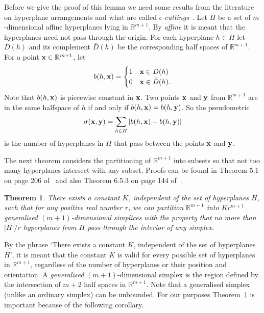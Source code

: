 \documentclass[aap]{imsart}
\newcommand{\reals}{{\mathbb R}}
\newcommand{\abs}[1]{\left\vert #1 \right\vert}
\newtheorem{theorem}{Theorem}
\begin{document}
Before we give the proof of this lemma we need some results from the literature on hyperplane arrangements and what are called \emph{$\epsilon$-cuttings}~\cite{Chazelle_discrepency_method_2000,Matousek_lect_disc_geom_2002}.  Let $H$ be a set of $m$-dimensional affine hyperplanes lying in $\reals^{m+1}$.  By \emph{affine} it is meant that  the hyperplanes need not pass through the origin.  For each hyperplane $h \in H$ let $D(h)$ and its complement $\bar{D}(h)$ be the corresponding half spaces of $\mathbb{R}^{m+1}$.  For a point $\mathbf{x} \in \mathbb{R}^{m+1}$, let
\begin{equation}\label{eq:bhsi}
b(h,\xbf) = \begin{cases} 
1 & \xbf \in D(h) \\
0 & \xbf \in \bar{D}(h).
\end{cases}
\end{equation}
Note that $b(h,\mathbf{x})$ is piecewise constant in $\mathbf{x}$.  Two points $\mathbf{x}$ and $\mathbf{y}$ from $\reals^{m+1}$ are in the same halfspace of $h$ if and only if $b(h, \mathbf{x}) = b(h, \mathbf{y})$.  So the pseudometric
\[
\sigma(\mathbf{x},\mathbf{y}) = \sum_{h \in H} |b(h,\mathbf{x}) - b(h,\mathbf{y})|
\]
is the number of hyperplanes in $H$ that pass between the points $\mathbf{x}$ and $\mathbf{y}$.  %

The next theorem considers the partitioning of $\reals^{m+1}$ into subsets so that not too many hyperplanes intersect with any subset.  Proofs can be found in Theorem 5.1 on page 206 of~\cite{Chazelle_discrepency_method_2000} and also Theorem 6.5.3 on page 144 of~\cite{Matousek_lect_disc_geom_2002}.

\begin{theorem}\label{thm:epscutting}
There exists a constant $K$, independent of the set of hyperplanes $H$, such that for any positive real number $r$, we can partition $\reals^{m+1}$ into $K r^{m+1}$ generalised $(m+1)$-dimensional simplices with the property that no more than $\abs{H}/r$ hyperplanes from $H$ pass through the interior of any simplex.
\end{theorem}

By the phrase `There exists a constant $K$, independent of the set of hyperplanes $H$', it is meant that the constant $K$ is valid for every possible set of hyperplanes in $\reals^{m+1}$, regardless of the number of hyperplanes or their position and orientation.  A \emph{generalised} $(m+1)$-dimensional simplex is the region defined by the intersection of $m+2$ half spaces in $\reals^{m+1}$.  Note that a generalised simplex (unlike an ordinary simplex) can be unbounded.  For our purposes Theorem~\ref{thm:epscutting} is important because of the following corollary.
\end{document}
